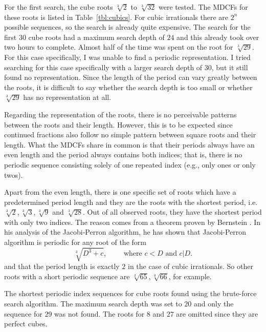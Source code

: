 For the first search, the cube roots $\sqrt[3]{2}$ to $\sqrt[3]{32}$ were tested.
The MDCFs for these roots is listed in Table~\ref{tbl:cubics}.
For cubic irrationals there are $2^n$ possible sequences,
so the search is already quite expensive.
The search for the first 30 cube roots had a maximum search depth of $24$ and
this already took over two hours to complete.
Almost half of the time was spent on the root for $\sqrt[3]{29}$.
For this case specifically, I was unable to find a periodic representation.
I tried searching for this case specifically with a larger search depth of $30$,
but it still found no representation.
Since the length of the period can vary greatly between the roots, it is
difficult to say whether the search depth is too small or whether
$\sqrt[3]{29}$ has no representation at all.

Regarding the representation of the roots,
there is no perceivable patterns between the roots and their length.
However, this is to be expected since continued fractions also follow no simple
pattern between square roots and their length.
What the MDCFs share in common is that their periods always have an even length
and the period always contains both indices;
that is, there is no periodic sequence consisting solely of one repeated index
(e.g., only ones or only twos).

Apart from the even length, there is one specific set of roots which have a
predetermined period length
and they are the roots with the shortest period, i.e. $\sqrt[3]{2},
\sqrt[3]{3}, \sqrt[3]{9}$ and $\sqrt[3]{28}$.
Out of all observed roots, they have the shortest period with only two indices.
The reason comes from a theorem proven by Bernstein \cite{Bernstein71}.
In his analysis of the Jacobi-Perron algorithm,
he has shown that Jacobi-Perron algorithm is periodic for any root of the form
\[
  \sqrt[3]{D^3 + c}, \qquad \text{ where } c < D \text{ and } c|D.
\]
and that the period length is exactly $2$ in the case of cubic irrationals.
So other roots with a short periodic sequence are $\sqrt[3]{65}, \sqrt[3]{66}$,
for example.

\begin{table}[tbp]
  \caption{
    The shortest periodic index sequences for cube roots found using the
    brute-force search algorithm. The maximum search depth was set to $20$ and
    only the sequence for $29$ was not found. The roots for $8$ and $27$ are
    omitted since they are perfect cubes.}
  \label{tbl:cubics}
  \centering
  
\end{table}

